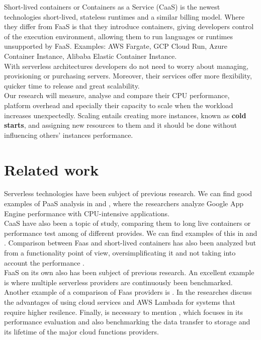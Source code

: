\documentclass[11pt]{article}
\begin{document}
Short-lived containers or Containers as a Service (CaaS) is the newest technologies short-lived, stateless runtimes and a similar billing model. Where they differ from FaaS is that they introduce containers, giving developers control of the execution environment, allowing them to run languages or runtimes unsupported by FaaS. Examples: AWS Fargate, GCP Cloud Run, Azure Container Instance, Alibaba Elastic Container Instance. \\


With serverless architectures developers do not need to worry about managing, provisioning or purchasing servers. Moreover, their services offer more flexibility, quicker time to release and great scalability. \\


Our research will measure, analyse and compare their CPU performance, platform overhead and specially their capacity to scale when the workload increases unexpectedly. Scaling entails creating more instances, known as \textbf{cold starts}, and assigning new resources to them and it should be done without influencing others' instances performance.


\section{Related work}

Serverless technologies have been subject of previous research.
We can find good examples of PaaS analysis in \cite{googleappengine} and \cite{googleappengine2},
where the researchers analyze Google App Engine performance with CPU-intensive applications. \\

CaaS have also been a topic of study,
comparing them to long live containers or performance test among of different provides.
We can find examples of this in \cite{cc} and \cite{dd}.
Comparison between Faas and short-lived containers has also been analyzed
but from a functionality point of view, oversimplificating it and not taking into account the performance \cite{ee}\cite{ff}\cite{gg}. \\

FaaS on its own also has been subject of previous research.
An excellent example is \cite{aa}
where multiple serverless providers are continuously been benchmarked.
Another example of a comparison of Faas providers is \cite{bb}.
In \cite{num14} the researches discuss the advantages of using cloud services
and AWS Lambada for systems that require higher resilence.
Finally, is necessary to mention \cite{laltre},
which focuses in its performance evaluation
and also benchmarking the data transfer to storage and its lifetime of the major cloud functions providers. \\
\end{document}
